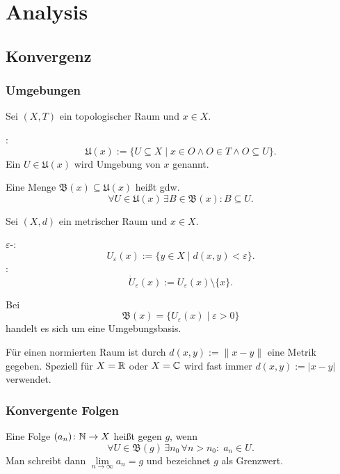 
\chapter{Analysis}
\section{Konvergenz}
\subsection{Umgebungen}
Sei $(X,T)$ ein topologischer Raum und $x\in X$.
\begin{Definition}
:
\begin{equation}
\mathfrak U(x) := \{U\subseteq X\mid x\in O\land O\in T
\land O\subseteq U\}.
\end{equation}
Ein $U\in\mathfrak U(x)$ wird Umgebung von $x$ genannt.
\end{Definition}
\begin{Definition}
Eine Menge $\mathfrak B(x)\subseteq \mathfrak U(x)$
heißt  gdw.
\begin{equation}
\forall U{\in}\mathfrak U(x)\,\exists B{\in}\mathfrak B(x)\colon
B\subseteq U.
\end{equation}
\end{Definition}

\noindent
Sei $(X,d)$ ein metrischer Raum und $x\in X$.
\begin{Definition}
$\varepsilon$-:
\begin{equation}\label{eq:epsilon-Umgebung}
U_\varepsilon(x) := \{y\in X\mid d(x,y)<\varepsilon\}.
\end{equation}
:
\begin{equation}
\dot U_\varepsilon(x) := U_\varepsilon(x)\setminus\{x\}.
\end{equation}
\end{Definition}
\noindent
Bei
\begin{equation}
\mathfrak B(x) = \{U_\varepsilon(x)\mid\varepsilon>0\}
\end{equation}
handelt es sich um eine Umgebungsbasis.

Für einen normierten Raum ist durch $d(x,y):=\|x-y\|$ eine
Metrik gegeben. Speziell für $X=\mathbb R$ oder $X=\mathbb C$ wird fast immer
$d(x,y):=|x-y|$ verwendet.

\subsection{Konvergente Folgen}
\begin{Definition}
Eine Folge $(a_n)\colon \mathbb N\to X$ heißt  gegen $g$, wenn%
\begin{equation}\label{eq:konvergent}
\forall U{\in}\mathfrak B(g)\,\exists n_0\,\forall n{>}n_0\colon\;
a_n\in U.
\end{equation}
Man schreibt dann $\lim\limits_{n\to\infty} a_n=g$ und bezeichnet
$g$ als Grenzwert.
\end{Definition}

